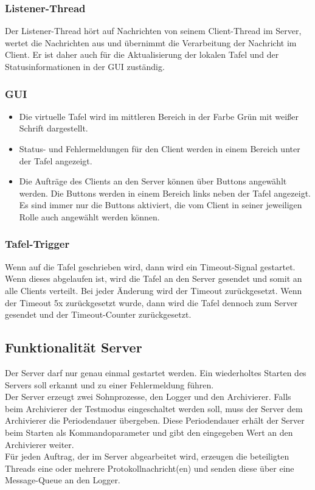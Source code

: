 \subsubsection{Listener-Thread}
Der Listener-Thread hört auf Nachrichten von seinem Client-Thread im Server, wertet die Nachrichten aus 
und übernimmt die Verarbeitung der Nachricht im Client. Er ist daher auch für die Aktualisierung der lokalen 
Tafel und der Statusinformationen in der GUI zuständig.

\subsubsection{GUI}
\begin{itemize}
	\item Die virtuelle Tafel wird im mittleren Bereich in der Farbe Grün mit weißer Schrift dargestellt.
	\item Status- und Fehlermeldungen für den Client werden in einem Bereich unter der Tafel angezeigt.
	\item Die Aufträge des Clients an den Server können über Buttons angewählt werden. Die Buttons werden 
in einem Bereich links neben der Tafel angezeigt. Es sind immer nur die Buttons aktiviert, die vom 
Client in seiner jeweiligen Rolle auch angewählt werden können.
\end{itemize}

\subsubsection{Tafel-Trigger}
Wenn auf die Tafel geschrieben wird, dann wird ein Timeout-Signal gestartet. Wenn dieses abgelaufen ist, 
wird die Tafel an den Server gesendet und somit an alle Clients verteilt. Bei jeder Änderung wird der 
Timeout zurückgesetzt. Wenn der Timeout 5x zurückgesetzt wurde, dann wird die Tafel dennoch zum Server 
gesendet und der Timeout-Counter zurückgesetzt.

\subsection{Funktionalität Server}
Der Server darf nur genau einmal gestartet werden. Ein wiederholtes Starten des Servers soll erkannt und 
zu einer Fehlermeldung führen. \\
Der Server erzeugt zwei Sohnprozesse, den Logger und den Archivierer. Falls beim Archivierer der Testmodus 
eingeschaltet werden soll, muss der Server dem Archivierer die Periodendauer übergeben. Diese Periodendauer 
erhält der Server beim Starten als Kommandoparameter und gibt den eingegeben Wert an den Archivierer weiter. \\
Für jeden Auftrag, der im Server abgearbeitet wird, erzeugen die beteiligten Threads eine oder mehrere 
Protokollnachricht(en) und senden diese über eine Message-Queue an den Logger. \\

